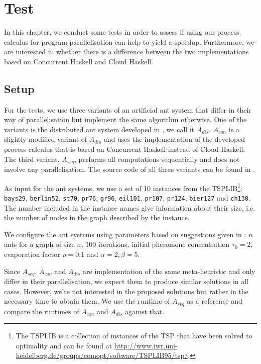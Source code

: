 \chapter{Test}
\label{chp:test}
\vspace*{-0.5em}
In this chapter, we conduct some tests in order to assess if using our process calculus for program parallelisation can help to yield a speedup. Furthermore, we are interested in whether there is a difference between the two implementations based on \textsf{Concurrent Haskell} and \textsf{Cloud Haskell}.

\section{Setup}
\vspace*{-0.5em}
For the tests, we use three variants of an artificial ant system that differ in their way of parallelisation but implement the same algorithm otherwise. One of the variants is the distributed ant system developed in , we call it $A_{dis}$. $A_{con}$ is a slightly modified variant of $A_{dis}$ and uses the implementation of the developed process calculus that is based on \textsf{Concurrent Haskell} instead of \textsf{Cloud Haskell}. The third variant, $A_{seq}$, performs all computations sequentially and does not involve any parallelisation. The source code of all three variants can be found in .

As input for the ant systems, we use a set of 10 instances from the TSPLIB\footnote{The TSPLIB is a collection of instances of the \textsc{TSP} that have been solved to optimality and can be found at \url{http://www.iwr.uni-heidelberg.de/groups/comopt/software/TSPLIB95/tsp/}.}: \texttt{bays29}, \texttt{berlin52}, \texttt{st70}, \texttt{pr76}, \texttt{gr96}, \texttt{eil101}, \texttt{pr107}, \texttt{pr124}, \texttt{bier127} and \texttt{ch130}. The number included in the instance names give information about their size, i.e. the number of nodes in the graph described by the instance.

We configure the ant systems using parameters based on suggestions given in \cite{Dorigo:2004:ACO:975277}: $n$ ants for a graph of size $n$, $100$ iterations, initial pheromone concentration $\tau_0 = 2$, evaporation factor $\rho = 0.1$ and $\alpha = 2, \beta = 5$.

Since $A_{seq}$, $A_{con}$ and $A_{dis}$ are implementation of the same meta-heuristic and only differ in their parallelisation, we expect them to produce similar solutions in all cases. However, we're not interested in the proposed solutions but rather in the necessary time to obtain them. We use the runtime of $A_{seq}$ as a reference and compare the runtimes of $A_{con}$ and $A_{dis}$ against that.


